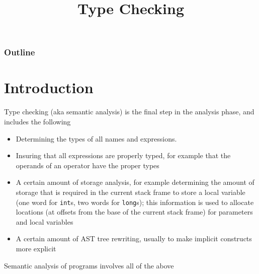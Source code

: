 \documentclass[8pt,a4paper,compress]{beamer}
\title{Type Checking}
\date{}
\begin{document}
\begin{frame}
\vfill
\titlepage
\end{frame}

\begin{frame}
\frametitle{Outline}
\tableofcontents
\end{frame}

\section{Introduction}
\begin{frame}[fragile]
\pause

Type checking (aka semantic analysis) is the final step in the analysis phase, and includes the following

\begin{itemize}
\item Determining the types of all names and expressions.
\item Insuring that all expressions are properly typed, for example that the operands of an operator have the proper types
\item A certain amount of storage analysis, for example determining the amount of storage that is required in the current stack frame to store a local variable (one word for \lstinline{int}s, two words for \lstinline{long}s); this information is used to allocate locations (at offsets from the base of the current stack frame) for parameters and local variables
\item A certain amount of AST tree rewriting, usually to make implicit constructs more explicit
\end{itemize}

\pause
\bigskip

Semantic analysis of \jmm programs involves all of the above
\end{frame}
\end{document}
